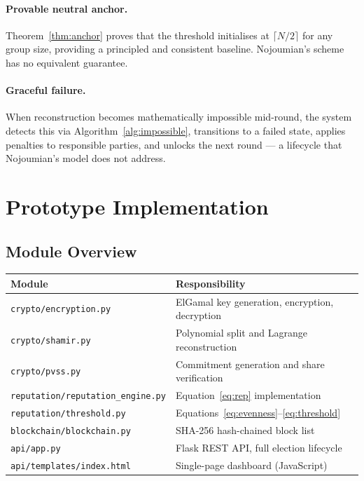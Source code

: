 \documentclass[12pt,a4paper]{article}
\theoremstyle{definition}
\theoremstyle{remark}
\begin{document}
\paragraph{Provable neutral anchor.}
Theorem~\ref{thm:anchor} proves that the threshold initialises at
$\lceil N/2 \rceil$ for any group size, providing a principled and
consistent baseline. Nojoumian's scheme has no equivalent guarantee.

\paragraph{Graceful failure.}
When reconstruction becomes mathematically impossible mid-round, the
system detects this via Algorithm~\ref{alg:impossible}, transitions
to a failed state, applies penalties to responsible parties, and
unlocks the next round — a lifecycle that Nojoumian's model does
not address.

\section{Prototype Implementation}
\label{sec:implementation}

\subsection{Module Overview}

\begin{center}
\small
\begin{tabular}{lp{8.5cm}}
\toprule
\textbf{Module} & \textbf{Responsibility} \\
\midrule
\texttt{crypto/encryption.py}      & ElGamal key generation, encryption, decryption \\
\texttt{crypto/shamir.py}          & Polynomial split and Lagrange reconstruction \\
\texttt{crypto/pvss.py}            & Commitment generation and share verification \\
\texttt{reputation/reputation\_engine.py} & Equation~\eqref{eq:rep} implementation \\
\texttt{reputation/threshold.py}   & Equations~\eqref{eq:evenness}--\eqref{eq:threshold} \\
\texttt{blockchain/blockchain.py}  & SHA-256 hash-chained block list \\
\texttt{api/app.py}                & Flask REST API, full election lifecycle \\
\texttt{api/templates/index.html}  & Single-page dashboard (JavaScript) \\
\bottomrule
\end{tabular}
\end{center}
\end{document}
